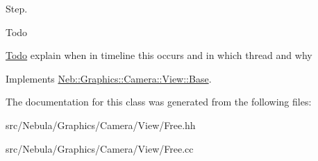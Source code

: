 \-Step. 

\begin{DoxyRefDesc}{\-Todo}
\item[\hyperlink{todo__todo000009}{\-Todo}]explain when in timeline this occurs and in which thread and why \end{DoxyRefDesc}


\-Implements \hyperlink{classNeb_1_1Graphics_1_1Camera_1_1View_1_1Base_a90b789b94d88db1e913f3c4933ea41d4}{\-Neb\-::\-Graphics\-::\-Camera\-::\-View\-::\-Base}.



\-The documentation for this class was generated from the following files\-:\begin{DoxyCompactItemize}
\item 
src/\-Nebula/\-Graphics/\-Camera/\-View/\-Free.\-hh\item 
src/\-Nebula/\-Graphics/\-Camera/\-View/\-Free.\-cc\end{DoxyCompactItemize}
